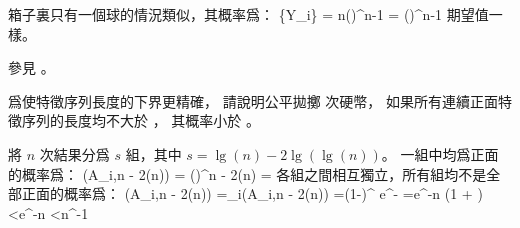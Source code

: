 箱子裏只有一個球的情況類似，其概率爲：
\startformula
\Pr\{Y_i\} = n\left(\right)^{n-1}
                = \left(\right)^{n-1} \approx {}
\stopformula
期望值一樣。

參見 。
\stopANSWER

\startEXERCISE \DIFFICULT
爲使特徵序列長度的下界更精確，
請說明公平拋擲  次硬幣，
如果所有連續正面特徵序列的長度均不大於 ，
其概率小於 。
\stopEXERCISE

\startANSWER
將 $n$ 次結果分爲 $s$ 組，其中 $s=\lg(n)-2\lg(\lg(n))$。
一組中均爲正面的概率爲：
\startformula
\Pr(A_{i,\lg n - 2\lg(\lg n)}) = \left(\right)^{\lg n - 2\lg(\lg n)} = 
\stopformula
各組之間相互獨立，所有組均不是全部正面的概率爲：
\startformula\startmathalignment
\NC  \NC \Pr(\bigwedge\neg A_{i,\lg n - 2\lg(\lg n)}) \NR
\NC =\NC \prod_i\Pr(\neg A_{i,\lg n - 2\lg(\lg n)}) \NR
\NC =\NC \left(1-\right)^{} \NR
\NC \le\NC e^{-} \NR
\NC =\NC e^{-\lg n \left(1 + \right)} \NR
\NC <\NC e^{-\lg n} \NR
\NC <\NC n^{-1} \NR
\stopmathalignment\stopformula
\stopANSWER

\stopsection
